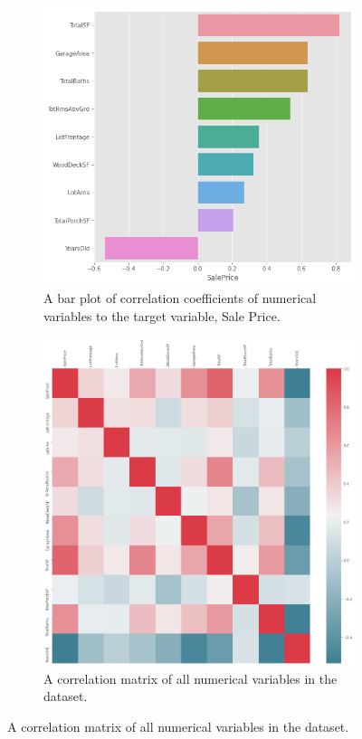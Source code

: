 \documentclass{article}
\begin{document}
	\begin{figure}[h!]
		\centering
		\begin{subfigure}[b]{0.4\linewidth}
		  \includegraphics[width=\linewidth]{salecorr}
		  \caption{A bar plot of correlation coefficients of numerical variables to the target variable, Sale Price.}
		\end{subfigure}
		\begin{subfigure}[b]{0.4\linewidth}
		  \includegraphics[width=\linewidth]{corrmatrix}
		  \caption{A correlation matrix of all numerical variables in the dataset.}
		\end{subfigure}
		\label{fig:correlation}
	  \end{figure}
	  
\end{document}
